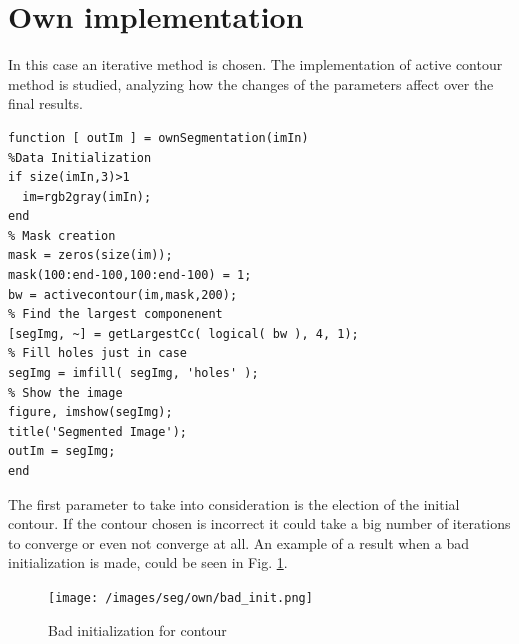 \documentclass[a4paper, 10pt, conference]{ieeeconf}        %
\begin{document}
\section{Own implementation}
In this case an iterative method is chosen. The implementation of active contour method is studied, analyzing how the changes of the parameters affect over the final results.
\begin{lstlisting}
function [ outIm ] = ownSegmentation(imIn)
%Data Initialization
if size(imIn,3)>1 
  im=rgb2gray(imIn);
end
% Mask creation
mask = zeros(size(im));
mask(100:end-100,100:end-100) = 1;
bw = activecontour(im,mask,200);
% Find the largest componenent
[segImg, ~] = getLargestCc( logical( bw ), 4, 1);
% Fill holes just in case
segImg = imfill( segImg, 'holes' );
% Show the image
figure, imshow(segImg);
title('Segmented Image');
outIm = segImg;
end
\end{lstlisting}

The first parameter to take into consideration is the election of the initial contour. If the contour chosen is incorrect it could take a big number of iterations to converge or even not converge at all. An example of a result when a bad initialization is made, could be seen in Fig. \ref{bad_init}.
\begin{figure}[ht!]
\centering
 \texttt{[image: /images/seg/own/bad\_init.png]}
 \caption{Bad initialization for contour}
 \label{bad_init}
\end{figure}
\end{document}
